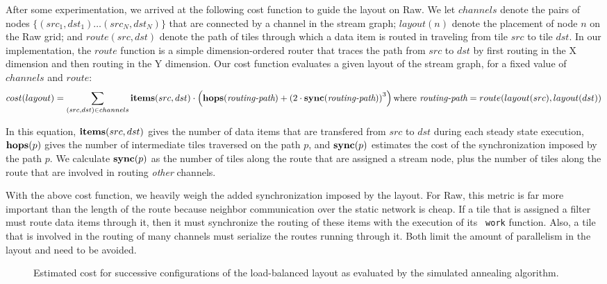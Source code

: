 After some experimentation, we arrived at the following cost function
to guide the layout on Raw.  We let $channels$ denote the pairs of
nodes $\{(src_1, dst_1) \dots (src_N, dst_N)\}$ that are connected by
a channel in the stream graph; $layout(n)$ denote the placement of
node $n$ on the Raw grid; and $route(src, dst)$ denote the path of
tiles through which a data item is routed in traveling from tile $src$
to tile $dst$.  In our implementation, the $route$ function is a
simple dimension-ordered router that traces the path from $src$ to
$dst$ by first routing in the X dimension and then routing in the Y
dimension.  Our cost function evaluates a given layout of the stream
graph, for a fixed value of $channels$ and $route$:
\begin{align*}
cost(layout) =  \sum_{(src,dst) \in channels}
 {\bf items}(src,dst)
\cdot  \left( {\bf hops}(\mbox{\it routing-path}) + 
  \left( 2 \cdot
{\bf sync}(\mbox{\it routing-path}) \right) ^{3} \right)  
\mbox{where } 
\mbox{\it routing-path} = route(layout(src), layout(dst))
\end{align*}

In this equation, ${\bf items}(src, dst)$ gives the number of data
items that are transfered from $src$ to $dst$ during each steady state
execution, ${\bf hops}(p)$ gives the number of intermediate tiles
traversed on the path $p$, and ${\bf sync}(p)$ estimates the cost of
the synchronization imposed by the path $p$.  We calculate ${\bf
sync}(p)$ as the number of tiles along the route that are assigned a
stream node, plus the number of tiles along the route that are
involved in routing {\it other} channels.

With the above cost function, we heavily weigh the added
synchronization imposed by the layout.  For Raw, this metric is far
more important than the length of the route because neighbor
communication over the static network is cheap.  If a tile that is
assigned a filter must route data items through it, then it must
synchronize the routing of these items with the execution of its {\tt
work} function.  Also, a tile that is involved in the routing of many
channels must serialize the routes running through it.  Both limit the
amount of parallelism in the layout and need to be avoided.

\begin{figure}
\centering
{}
\parbox{4in}{\caption{\protect\small Estimated cost for successive
configurations of the load-balanced \BeamFormer layout as evaluated by
the simulated annealing algorithm. \protect\label{fig:anneal-cost}}}
\end{figure}

